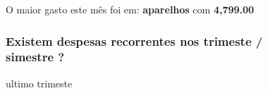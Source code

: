 \documentclass[
  8pt,
  a4paper,
  DIV=11,
  numbers=noendperiod]{scrartcl}
\begin{document}
\begin{figure}
\begin{minipage}{0.50\linewidth}
O maior gasto este mês foi em: \textbf{aparelhos} com \textbf{4,799.00}

\end{minipage}%

\end{figure}%

\begin{figure}

\begin{minipage}{0.50\linewidth}

\subsubsection{Existem despesas recorrentes nos trimeste / simestre
?}\label{existem-despesas-recorrentes-nos-trimeste-simestre}

ultimo trimeste\end{minipage}%
%
\begin{minipage}{0.50\linewidth}

\end{minipage}%
\newline
\begin{minipage}{0.50\linewidth}


\end{minipage}
\end{figure}
\end{document}
